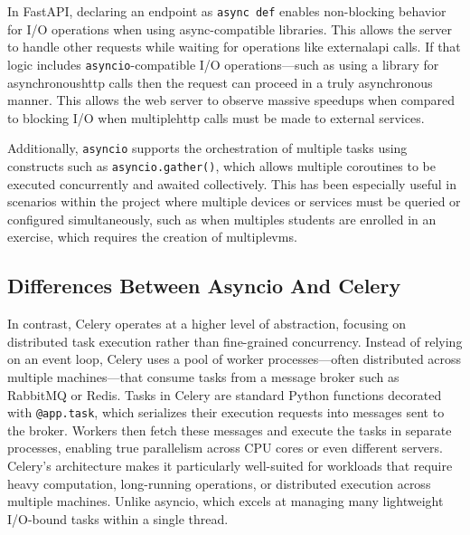     In FastAPI, declaring an endpoint as \texttt{async def} enables non-blocking behavior for I/O operations when using 
    async-compatible libraries. This allows the server to handle other requests while waiting for operations like 
    external\ac{api} calls. If that logic includes \texttt{asyncio}-compatible I/O operations—such as using a 
    library for asynchronous\ac{http} calls then the request can proceed in a truly asynchronous manner. This 
    allows the web server to observe massive speedups when compared to blocking I/O when multiple\ac{http} calls 
    must be made to external services.

    Additionally, \texttt{asyncio} supports the orchestration of multiple tasks using constructs such as \texttt{asyncio.gather()}, 
    which allows multiple coroutines to be executed concurrently and awaited collectively. This has been especially useful in 
    scenarios within the project where multiple devices or services must be queried or configured simultaneously, such as 
    when multiples students are enrolled in an exercise, which requires the creation of multiple\ac{vm}s.

    \subsection{Differences Between Asyncio And Celery}

        In contrast, Celery operates at a higher level of abstraction, focusing on distributed task execution rather 
        than fine-grained concurrency. Instead of relying on an event loop, Celery uses a pool of worker 
        processes—often distributed across multiple machines—that consume tasks from a message broker such as RabbitMQ 
        or Redis. Tasks in Celery are standard Python functions decorated with \texttt{@app.task}, which serializes their 
        execution requests into messages sent to the broker. Workers then fetch these messages and execute the tasks 
        in separate processes, enabling true parallelism across CPU cores or even different servers. Celery's 
        architecture makes it particularly well-suited for workloads that require heavy computation, long-running 
        operations, or distributed execution across multiple machines. Unlike asyncio, which excels at managing many 
        lightweight I/O-bound tasks within a single thread.


